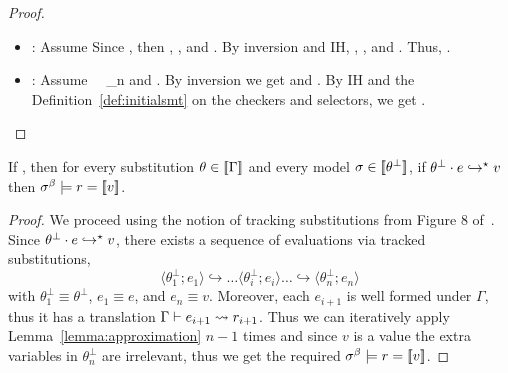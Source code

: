 \begin{proof}
\begin{itemize}
\item \lgcaseBool : 
Assume
	 {}{\embed{\typ}}{\smtenv}{}
Since 
  , then 
  , 
  , and
  .
%  
By inversion and IH, 
  \smthastype{\smtenvinit, \embed{\env}}{\pred}{\tbool}, 
  , and
  .
Thus, 
  .

\item \lgcase : 
Assume 
	 { \ \ \pred_n}{\embed{\typ}}{\smtenv}
	 {} and
	 .
By inversion we get 
	 and
	.
By IH and the Definition~\ref{def:initialsmt} on the checkers and selectors, we get
  .
\end{itemize}
\end{proof}


\newcommand\tsub[1]{\ensuremath{{\theta_{#1}^\perp}}\xspace}
\newcommand\track[2]{\ensuremath{\langle #1; #2\rangle}\xspace}
\begin{theorem}\label{thm:approximation}
If ,
then for every substitution $\theta\in[\![\Gamma]\!]$
and every model $\sigma\in[\![\theta^\perp]\!]$,
if ${{\theta^\perp} \cdot {\ensuremath{e}} }\hookrightarrow^{\star}{v}$ then $\sigma^\beta \models r = [\![v]\!]$.
\end{theorem}
\begin{proof}
We proceed using the notion of tracking substitutions from Figure 8 of~\citep{Vazou14-tech}. 
Since ${{\theta^\perp} \cdot {\ensuremath{e}} }\hookrightarrow^{\star}{v}$, 
there exists a sequence of evaluations via tracked substitutions, 
$$
\track{\tsub{1}}{e_1} \hookrightarrow \dots \track{\tsub{i}}{e_i} \dots \hookrightarrow \track{\tsub{n}}{e_n}
$$
with $\tsub{1}\equiv\tsub{}$, $e_1\equiv e$, and $e_n\equiv v$. 
Moreover, each $e_{i+1}$ is well formed under $\Gamma$, 
thus it has a translation 
$ \Gamma\vdash e_{i+1} \rightsquigarrow r_{i+1} $. 
%
Thus we can iteratively apply Lemma~\ref{lemma:approximation} $n-1$ times and 
since $v$ is a value the extra variables in $\tsub{n}$ are irrelevant, thus we
get the required
$\sigma^\beta \models r = [\![v]\!]$. 
\end{proof}

